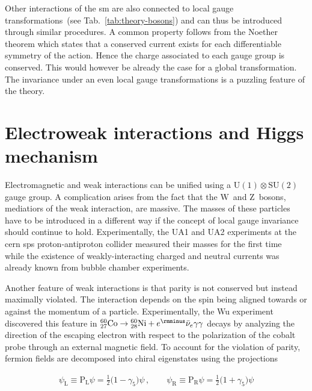 Other interactions of the \gls{sm} are also connected to local gauge transformations~(see Tab.~\ref{tab:theory-bosons}) and can thus be introduced through similar procedures. A common property follows from the Noether theorem which states that a conserved current exists for each differentiable symmetry of the action. Hence the charge associated to each gauge group is conserved. This would however be already the case for a global transformation. The invariance under an even local gauge transformations is a puzzling feature of the theory.



\section{Electroweak interactions and Higgs mechanism}
\label{sec:theory-ewk}

Electromagnetic and weak interactions can be unified using a $\mathrm{U(1)}\otimes \mathrm{SU(2)}$ gauge group. A complication arises from the fact that the $\mathrm{W}$~and $\mathrm{Z}$~bosons, mediatiors of the weak interaction, are massive. The masses of these particles have to be introduced in a different way if the concept of local gauge invariance should continue to hold. Experimentally, the UA1 and UA2 experiments at the \gls{cern} \gls{sps} proton-antiproton collider measured their masses for the first time~\cite{Arnison:1983rp,Banner:1983jy,Arnison:1983mk,Bagnaia:1983zx} while the existence of weakly-interacting charged and neutral currents was already known from bubble chamber experiments. 

Another feature of weak interactions is that parity is not conserved but instead maximally violated. The interaction depends on the spin being aligned towards or against the momentum of a particle. Experimentally, the Wu experiment~\cite{PhysRev.105.1413} discovered this feature in ${}_{27}^{60}\mathrm{Co}\to{}_{28}^{60}\mathrm{Ni}+e^{\rmminus}\bar{\nu}_{e}\gamma\gamma$ decays by analyzing the direction of the escaping electron with respect to the polarization of the cobalt probe through an external magnetic field. To account for the violation of parity, fermion fields are decomposed into chiral eigenstates using the projections

\begin{align}
\psi_\mathrm{L}\equiv\mathrm{P}_\mathrm{L}\psi=\tfrac{1}{2}\big(1-\gamma_{5}\big)\psi\,,\qquad \psi_\mathrm{R}\equiv\mathrm{P}_\mathrm{R}\psi=\tfrac{1}{2}\big(1+\gamma_{5}\big)\psi
\end{align}

